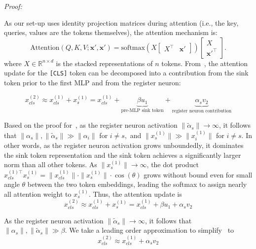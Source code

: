\documentclass{article}
\begin{document}
\textit{Proof:}

As our set-up uses identity projection matrices during attention (i.e., the key, queries, values are the tokens themselves), the attention mechanism is:
\begin{equation}
\text{Attention}(Q, K, V; \mathbf{x}', \mathbf{x}') =
\text{softmax}\!\left(
X \begin{bmatrix} X^\top & \mathbf{x}' \end{bmatrix}
\right)
\begin{bmatrix} X \\ \mathbf{x}'^{\!\top} \end{bmatrix}.
\label{attention_bias_proof1}
\end{equation}
where $X\in \mathbb{R}^{n\times d}$ is the stacked representations of $n$ tokens. From~, the attention update for the \texttt{[CLS]} token can be decomposed into a contribution from the sink token prior to the first MLP and from the register neuron:

\begin{equation}
    x^{(2)}_{cls} \approx x^{(1)}_{cls} + x^{(1)}_{s} = x^{(1)}_{cls} + \underbrace{\beta u_1}_{\text{pre-MLP sink token}} +\underbrace{\alpha_sv_2}_{\text{register neuron contribution}}
    \label{attention_update_decomposition}
\end{equation} 

Based on the proof for~, as the register neuron activation \( \|\tilde{\alpha}_s\| \to \infty \), it follows that $\|\alpha_s\|,\|\tilde{\alpha}_s\| \gg \|\alpha_i\|$ for $i\neq s,$ and $\|x^{(1)}_{s}\| \gg \|x^{(1)}_{i}\|$ for $i\neq s$. In other words, as the register neuron activation grows unboundedly, it dominates the sink token representation and the sink token achieves a significantly larger norm than all other tokens. As \( \|x^{(1)}_{s}\| \to \infty \), the dot product $x^{(1)\top}_{cls} x^{(1)}_{s} = \|x^{(1)}_{cls}\| \cdot \|x^{(1)}_{s}\| \cdot \cos(\theta)$
grows without bound even for small angle \( \theta \) between the two token embeddings, leading the softmax to assign nearly all attention weight to \( x^{(1)}_{s} \). Thus, the attention update is
\begin{equation}
    x^{(2)}_{cls} \approx x^{(1)}_{cls} + x^{(1)}_{s} = x^{(1)}_{cls} + \beta u_1+\alpha_sv_2
    \label{attention_update_decomposition2}
\end{equation} 

As the register neuron activation \( \|\tilde{\alpha}_s\| \to \infty \), it follows that $\|\alpha_s\|,\|\tilde{\alpha}_s\| \gg \beta$. We take a leading order approximation to simplify~ to 
\begin{equation}
    x^{(2)}_{cls} \approx x^{(1)}_{cls} + \alpha_sv_2
    \label{attention_update_decomposition}
\end{equation} 
\end{document}
